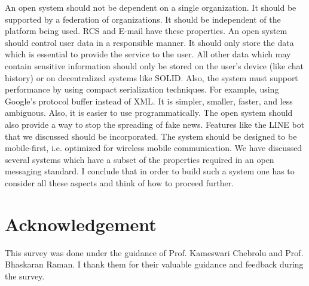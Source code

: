 \documentclass[12pt, conference, a4paper]{article}
\begin{document}
An open system should not be dependent on a single organization. It should be supported by a federation of organizations. It should be independent of the platform being used. RCS and E-mail have these properties. 
An open system should control user data in a responsible manner. It should only store the data which is essential to provide the service to the user. All other data which may contain sensitive information should only be stored on the user's device (like chat history) or on decentralized systems like SOLID.  
Also, the system must support performance by using compact serialization techniques. For example, using Google’s protocol buffer instead of XML. It is simpler, smaller, faster, and less ambiguous. Also, it is easier to use programmatically. 
The open system should also provide a way to stop the spreading of fake news. Features like the LINE bot that we discussed should be incorporated. The system should be designed to be mobile-first,        i.e. optimized for wireless mobile communication. 
We have discussed several systems which have a subset of the properties required in an open messaging standard. I conclude that in order to build such a system one has to consider all these aspects and think of how to proceed further.

\section{Acknowledgement}
\label{SEC:acknowledgement}
This survey was done under the guidance of Prof. Kameswari Chebrolu and Prof. Bhaskaran Raman. I thank them for their valuable guidance and feedback during the survey.



\newpage
\nocite{*}
\printbibliography
\end{document}
